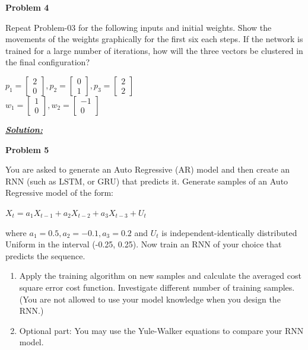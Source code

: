 \documentclass{article}
\begin{document}
\newpage
\noindent \textbf{Problem 4}

\noindent Repeat Problem-03 for the following inputs and initial weights. Show the movements of 
the weights graphically for the first six each steps. If the network is trained for a large 
number of iterations, how will the three vectors be clustered in the final configuration?

\begin{center}
    $p_1 = \begin{bmatrix}
        2\\
        0
      \end{bmatrix}, p_2 = \begin{bmatrix}
        0\\
        1
      \end{bmatrix}, p_3 = \begin{bmatrix}
        2\\
        2
      \end{bmatrix}$\\
      \vspace{1cm}
      $w_1 = \begin{bmatrix}
        1\\
        0
      \end{bmatrix}, w_2 = \begin{bmatrix}
        -1\\
        0
      \end{bmatrix}$
      \vspace{1cm}

\end{center}

\noindent \underline{\textbf{\textit{Solution:}}}


\newpage
\noindent \textbf{Problem 5}

\noindent You are asked to generate an Auto Regressive (AR) model and then create an RNN (such 
as LSTM, or GRU) that predicts it. Generate samples of an Auto Regressive model of 
the form: 
\begin{center}
    $X_t = a_1X_{t-1} + a_2X_{t-2} + a_3X_{t-3} + U_t$
    
\end{center}
where $a_1= 0.5, a_2= -0.1, a_3= 0.2$ and $U_t$ is independent-identically distributed Uniform in 
the interval (-0.25, 0.25). Now train an RNN of your choice that predicts the sequence. 

\begin{enumerate} [label=\Alph*]
    \item Apply the training algorithm on new samples and calculate the averaged cost square 
    error cost function. Investigate different number of training samples. (You are not 
    allowed to use your model knowledge when you design the RNN.)
    \item Optional part: You may use the Yule-Walker equations to compare your RNN 
    model. 
    
\end{enumerate}
\end{document}
